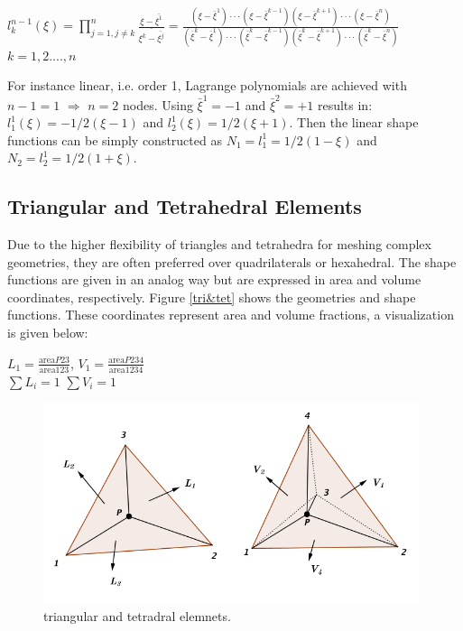 \begin{center}
	$l_k^{n-1} \left( \xi \right) = \prod_{j = 1, j \neq k}^{n} \frac{\xi - \bar{\xi^1}}{\bar{\xi^k - \bar{\xi^j}}} = \frac{\left(\xi - \bar{\xi}^1\right)\cdot\cdot\cdot \left( \xi - \bar{\xi}^{k-1}\right) \left(\xi - \bar{\xi}^{k+1}\right)\cdot\cdot\cdot \left(\xi -\bar{\xi}^n\right)}{\left(\bar{\xi}^k - \bar{\xi}^1\right)\cdot\cdot\cdot \left( \bar{\xi}^k - \bar{\xi}^{k-1}\right) \left(\bar{\xi}^k - \bar{\xi}^{k+1}\right)\cdot\cdot\cdot \left(\bar{\xi}^k -\bar{\xi}^n\right)}$ \\[4mm] \quad $k = 1,2....,n$
\end{center}
For instance linear, i.e. order 1, Lagrange polynomials are achieved with $n-1=1$ $\Rightarrow$ $n=2$ nodes. Using $\bar{\xi}^1 = -1$ and $\bar{\xi}^2 = +1$ results in: $l_1^1\left(\xi\right) = -1/2\left(\xi - 1\right)$ and $l_2^1\left(\xi\right) = 1/2\left(\xi + 1\right)$.
Then the linear shape functions can be simply constructed as $N_1 =l_1^1 = 1/2\left(1-\xi\right)$ and $N_2 = l_2^1 = 1/2\left(1+\xi\right)$.

\subsection{Triangular and Tetrahedral Elements}
Due to the higher flexibility of triangles and tetrahedra for meshing complex geometries, they are often preferred over quadrilaterals or hexahedral. The shape functions are given in an analog way but are expressed in area and volume coordinates, respectively. Figure \ref{tri&tet} shows the geometries and shape functions. These coordinates represent area and volume fractions, a visualization is given below:
\begin{center}
	$L_1 = \frac{\text{area}P23}{\text{area}123}$, \quad $V_1 = \frac{\text{area}P234}{\text{area}1234}$ \\[4mm]
	$\sum L_i = 1$ \quad\quad $\sum V_i = 1$
\end{center}

\begin{figure}
	\begin{center}
		\includegraphics[width=11cm,clip]{Tri&Tet.pdf}			
		\caption{triangular and tetradral elemnets.} \label{fig: tri&tet}
	\end{center}
\end{figure}


